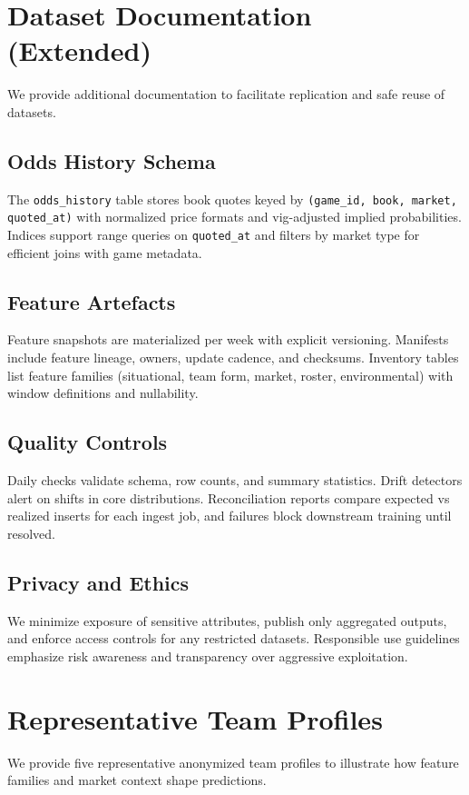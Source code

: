 \section{Dataset Documentation (Extended)}\label{app:dataset-docs}
We provide additional documentation to facilitate replication and safe reuse of datasets.

\subsection{Odds History Schema}
The \texttt{odds\_history} table stores book quotes keyed by \texttt{(game\_id, book, market, quoted\_at)} with normalized price formats and vig-adjusted implied probabilities. Indices support range queries on \texttt{quoted\_at} and filters by market type for efficient joins with game metadata.

\subsection{Feature Artefacts}
Feature snapshots are materialized per week with explicit versioning. Manifests include feature lineage, owners, update cadence, and checksums. Inventory tables list feature families (situational, team form, market, roster, environmental) with window definitions and nullability.

\subsection{Quality Controls}
Daily checks validate schema, row counts, and summary statistics. Drift detectors alert on shifts in core distributions. Reconciliation reports compare expected vs realized inserts for each ingest job, and failures block downstream training until resolved.

\subsection{Privacy and Ethics}
We minimize exposure of sensitive attributes, publish only aggregated outputs, and enforce access controls for any restricted datasets. Responsible use guidelines emphasize risk awareness and transparency over aggressive exploitation.

\section{Representative Team Profiles}\label{app:team-profiles}
We provide five representative anonymized team profiles to illustrate how feature families and market context shape predictions.

